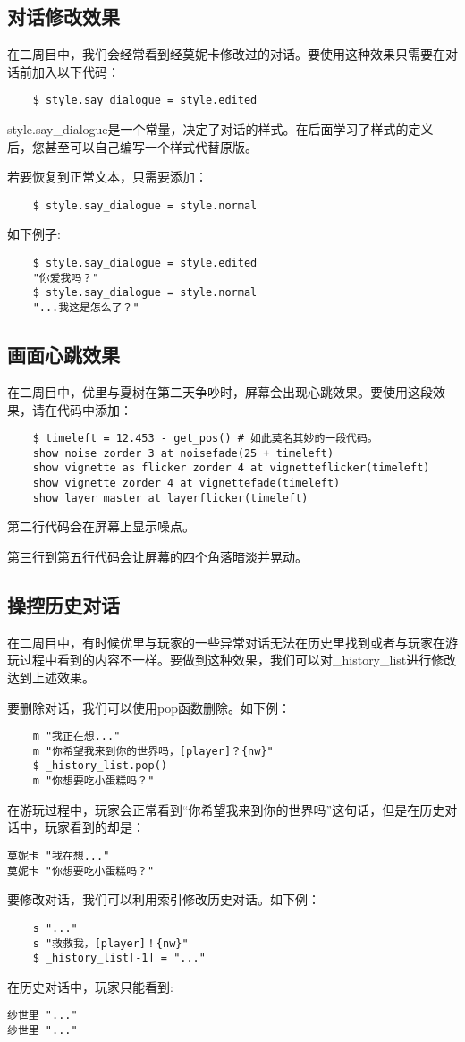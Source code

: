 \subsection{对话修改效果}
在二周目中，我们会经常看到经莫妮卡修改过的对话。要使用这种效果只需要在对话前加入以下代码：
\begin{lstlisting}
    $ style.say_dialogue = style.edited
\end{lstlisting}

\begin{ExtraKnowledge}
    style.say\_dialogue是一个常量，决定了对话的样式。在后面学习了样式的定义后，您甚至可以自己编写一个样式代替原版。
\end{ExtraKnowledge}

若要恢复到正常文本，只需要添加：
\begin{lstlisting}
    $ style.say_dialogue = style.normal
\end{lstlisting}

如下例子:
\begin{lstlisting}
    $ style.say_dialogue = style.edited
    "你爱我吗？"
    $ style.say_dialogue = style.normal
    "...我这是怎么了？"
\end{lstlisting}

\subsection{画面心跳效果}
在二周目中，优里与夏树在第二天争吵时，屏幕会出现心跳效果。要使用这段效果，请在代码中添加：
\begin{lstlisting}
    $ timeleft = 12.453 - get_pos() # 如此莫名其妙的一段代码。
    show noise zorder 3 at noisefade(25 + timeleft) 
    show vignette as flicker zorder 4 at vignetteflicker(timeleft)
    show vignette zorder 4 at vignettefade(timeleft)
    show layer master at layerflicker(timeleft)
\end{lstlisting}

第二行代码会在屏幕上显示噪点。

第三行到第五行代码会让屏幕的四个角落暗淡并晃动。

\subsection{操控历史对话}
在二周目中，有时候优里与玩家的一些异常对话无法在历史里找到或者与玩家在游玩过程中看到的内容不一样。要做到这种效果，我们可以对\_history\_list进行修改达到上述效果。

要删除对话，我们可以使用pop函数删除。如下例：
\begin{lstlisting}
    m "我正在想..."
    m "你希望我来到你的世界吗，[player]？{nw}"
    $ _history_list.pop()
    m "你想要吃小蛋糕吗？"
\end{lstlisting}
在游玩过程中，玩家会正常看到“你希望我来到你的世界吗”这句话，但是在历史对话中，玩家看到的却是：
\begin{lstlisting}
莫妮卡 "我在想..."
莫妮卡 "你想要吃小蛋糕吗？"
\end{lstlisting}

要修改对话，我们可以利用索引修改历史对话。如下例：
\begin{lstlisting}
    s "..."
    s "救救我，[player]！{nw}"
    $ _history_list[-1] = "..."
\end{lstlisting}

在历史对话中，玩家只能看到:
\begin{lstlisting}
纱世里 "..."
纱世里 "..."
\end{lstlisting}